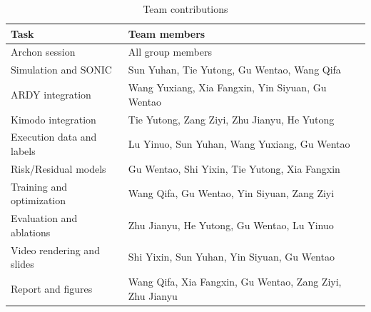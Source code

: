 \begin{table}[t]
\centering
\caption{Team contributions}
\label{tab:team-contributions}
\begingroup
\fontsize{9}{10.6}\selectfont
\setlength{\tabcolsep}{4pt}
\renewcommand{\arraystretch}{1.0}
\begin{tabular}{@{}p{}p{}@{}}
\toprule
Task & Team members\\
\midrule
Archon session & All group members\\
Simulation and SONIC & Sun Yuhan, Tie Yutong, Gu Wentao, Wang Qifa\\
ARDY integration & Wang Yuxiang, Xia Fangxin, Yin Siyuan, Gu Wentao\\
Kimodo integration & Tie Yutong, Zang Ziyi, Zhu Jianyu, He Yutong\\
Execution data and labels & Lu Yinuo, Sun Yuhan, Wang Yuxiang, Gu Wentao\\
Risk/Residual models & Gu Wentao, Shi Yixin, Tie Yutong, Xia Fangxin\\
Training and optimization & Wang Qifa, Gu Wentao, Yin Siyuan, Zang Ziyi\\
Evaluation and ablations & Zhu Jianyu, He Yutong, Gu Wentao, Lu Yinuo\\
Video rendering and slides & Shi Yixin, Sun Yuhan, Yin Siyuan, Gu Wentao\\
Report and figures & Wang Qifa, Xia Fangxin, Gu Wentao, Zang Ziyi, Zhu Jianyu\\
\bottomrule
\end{tabular}
\endgroup
\end{table}
